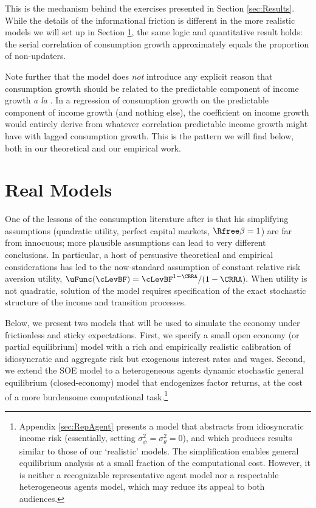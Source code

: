 \documentclass[titlepage]{\econtex}\newcommand{\texname}{cAndCwithStickyE}
\begin{document}
This is the mechanism behind the exercises presented in Section \ref{sec:Results}.  While the details of the informational friction is different in the more realistic models we will set up in Section \ref{sec:models}, the same logic and quantitative result holds: the serial correlation of consumption growth approximately equals the proportion of non-updaters.

Note further that the model does {\it not} introduce any explicit reason that consumption growth should be related to the predictable component of income growth {\it a la} \cite{cmModel}.  In a regression of consumption growth on the predictable component of income growth (and nothing else), the coefficient on income growth would entirely derive from whatever correlation predictable income growth might have with lagged consumption growth.  This is the pattern we will find below, both in our theoretical and our empirical work.



\section{Real Models}
\label{sec:models}

One of the lessons of the consumption literature after \cite{hallRandomWalk} is that his simplifying assumptions (quadratic utility, perfect capital markets, $\Rfree\beta=1$) are far from innocuous; more plausible assumptions can lead to very different conclusions.  In particular, a host of persuasive theoretical and empirical considerations has led to the now-standard assumption of constant relative risk aversion utility, $\uFunc(\cLevBF)=\cLevBF^{1-\CRRA}/(1-\CRRA).$ When utility is not quadratic, solution of the model requires specification of the exact stochastic structure of the income and transition processes.

Below, we present two models that will be used to simulate the economy under frictionless and sticky expectations.  First, we specify a small open economy (or partial equilibrium) model with a rich and empirically realistic calibration of idiosyncratic and aggregate risk but exogenous interest rates and wages. Second, we extend the SOE model to a heterogeneous agents dynamic stochastic general equilibrium (closed-economy) model that endogenizes factor returns, at the cost of a more burdensome computational task.\footnote{Appendix \ref{sec:RepAgent} presents a model that abstracts from idiosyncratic income risk (essentially, setting $\sigma^{2}_{\psi}=\sigma^{2}_{\theta}=0$), and which produces results similar to those of our `realistic' models.  The simplification enables general equilibrium analysis at a small fraction of the computational cost. However, it is neither a recognizable representative agent model nor a respectable heterogeneous agents model, which may reduce its appeal to both audiences.}
\end{document}
